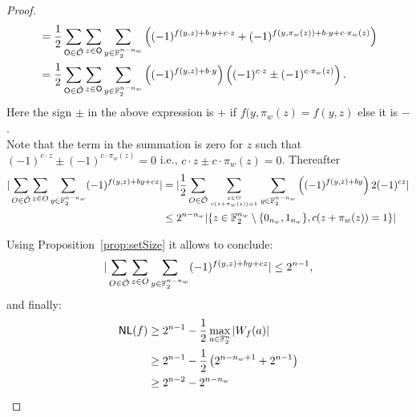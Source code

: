 \documentclass{llncs}
\begin{document}
\begin{proof}
\begin{align*}
& = \frac{1}{2} \sum_{\mathsf{O} \in \hat{\mathcal{O}}} \sum_{z \in \mathsf{O}} \sum_{y \in \mathbb{F}_2^{n-n_w}} \left((-1)^{f(y,z) + b\cdot y + c\cdot z} + (-1)^{f(y,\pi_w(z)) + b\cdot y + c\cdot \pi_w(z)} \right)\\
& =  \frac{1}{2} \sum_{\mathsf{O} \in \hat{\mathcal{O}}} \sum_{z \in \mathsf{O}} \sum_{y \in \mathbb{F}_2^{n-n_w}}
\left((-1)^{f(y,z)+b\cdot y}  \right)\left( (-1)^{c \cdot z} \pm (-1)^{c\cdot \pi_w(z)} \right).
\end{align*}
Here the sign $\pm$ in the above expression is $+$ if $f(y,\pi_w(z) = f(y,z)$ else it is $-$.\\
Note that the term in the summation is zero for $z$ such that $(-1)^{c\cdot z} \pm (-1)^{c\cdot  \pi_w(z)} = 0$ i.e., $c\cdot z \pm c\cdot \pi_w(z) = 0$.
Thereafter
\begin{align*}
|\sum_{O \in \hat{\mathcal{O}}} \sum_{z \in O} \sum_{y\in \mathbb{F}_2^{n-n_w}}(-1)^{f(y,z)+by+cz}|
&=|\frac{1}{2} \sum_{O \in \hat{\mathcal{O}}} \sum_{z\in O \atop {c(z+\pi_w(z))=1}} \sum_{y\in \mathbb{F}_2^{n-n_w}} \left((-1)^{f(y,z)+by}  \right)2(-1)^{cz}|\\
&\le 2^{n-n_w} |\{ z \in \mathbb{F}_2^{n_w} \setminus \{0_{n_w},1_{n_w}\},  c(z+\pi_w(z))=1   \}|
\end{align*}

Using Proposition~\ref{prop:setSize} it allows to conclude:
\[|\sum_{O \in \hat{\mathcal{O}}} \sum_{z \in O} \sum_{y\in \mathbb{F}_2^{n-n_w}}(-1)^{f(y,z)+by+cz}|\le 2^{n-1},\]
and finally:
\begin{align*}
\mathsf{NL}(f)&\ge 2^{n-1}-\frac{1}{2} \max_{a\in \mathbb{F}_2^n}| W_{f}(a)|\\
&\ge 2^{n-1}-\frac{1}{2} \left(2^{n-n_w+1} + 2^{n-1}\right)\\
&\ge 2^{n-2} - 2^{n-n_w}
\end{align*} 




\end{proof}


\end{document}
